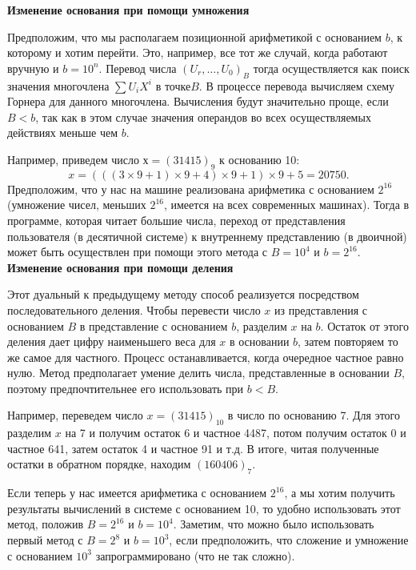 \textbf{Изменение основания при помощи умножения}
\par
 Предположим, что мы располагаем позиционной арифметикой с 
основанием $b$, к которому и хотим перейти. Это, например, все тот же
случай, когда работают вручную и $b = 10^n$. Перевод числа $(U_{r},\ldots,U_{0})_{B}$ тогда осуществляется как поиск значения многочлена $\sum U_{i}X^{i}$ в точке$B$. В процессе перевода вычисляем схему Горнера для данного 
многочлена. Вычисления будут значительно проще, если $B < b$, так как
в этом случае значения операндов во всех осуществляемых действиях
меньше чем $b$.\par
Например, приведем число $х = (31415)_9$ к основанию 10:
$$x = (((3 \times 9+1)\times9 + 4)\times9+1)\times9 + 5 = 20750.$$
Предположим, что у нас на машине реализована арифметика с 
основанием $2^{16}$ (умножение чисел, меньших $2^{16}$, имеется на всех современных машинах). Тогда в программе, которая читает большие числа, переход от представления пользователя (в десятичной системе) к внутреннему представлению (в двоичной) может быть осуществлен при помощи этого метода с $B = 10^{4}$ и $b = 2^{16}$. \\

\textbf{Изменение основания при помощи деления} \par
Этот дуальный к предыдущему методу способ реализуется 
посредством последовательного деления. Чтобы перевести число $x$ из
представления с основанием $B$ в представление с основанием $b$, 
разделим $x$ на $b$. Остаток от этого деления дает цифру наименьшего веса для
$x$ в основании $b$, затем повторяем то же самое для частного. Процесс
останавливается, когда очередное частное равно нулю. Метод 
предполагает умение делить числа, представленные в основании $B$, поэтому предпочтительнее его использовать при $b < B$.\par
Например, переведем число $x = (31415)_{10}$ в число по основанию 7.
Для этого разделим $x$ на 7 и получим остаток 6 и частное 4487, 
потом получим остаток 0 и частное 641, затем остаток 4 и частное 91
и т.д. В итоге, читая полученные остатки в обратном порядке, 
находим $(160406)_{7}$.\par
Если теперь у нас имеется арифметика с основанием $2^16$, а мы 
хотим получить результаты вычислений в системе с основанием 10, то
удобно использовать этот метод, положив $B = 2^{16}$ и $b = 10^{4}$. Заметим,
что можно было использовать первый метод с $B = 2^{8}$ и $b=10^{3}$, если
предположить, что сложение и умножение с основанием $10^{3}$ 
запрограммировано (что не так сложно). %

